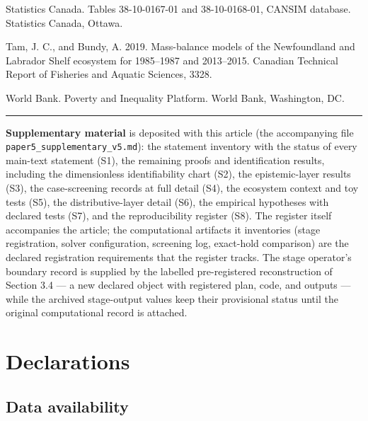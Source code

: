 \documentclass[11pt]{article}
\begin{document}
Statistics Canada. Tables 38-10-0167-01 and 38-10-0168-01, CANSIM
database. Statistics Canada, Ottawa.

Tam, J. C., and Bundy, A. 2019. Mass-balance models of the Newfoundland
and Labrador Shelf ecosystem for 1985--1987 and 2013--2015. Canadian
Technical Report of Fisheries and Aquatic Sciences, 3328.

World Bank. Poverty and Inequality Platform. World Bank, Washington, DC.

\begin{center}\rule{0.5\linewidth}{0.5pt}\end{center}

\textbf{Supplementary material} is deposited with this article (the
accompanying file \texttt{paper5\_supplementary\_v5.md}): the statement
inventory with the status of every main-text statement (S1), the
remaining proofs and identification results, including the dimensionless
identifiability chart (S2), the epistemic-layer results (S3), the
case-screening records at full detail (S4), the ecosystem context and
toy tests (S5), the distributive-layer detail (S6), the empirical
hypotheses with declared tests (S7), and the reproducibility register
(S8). The register itself accompanies the article; the computational
artifacts it inventories (stage registration, solver configuration,
screening log, exact-hold comparison) are the declared registration
requirements that the register tracks. The stage operator's boundary
record is supplied by the labelled pre-registered reconstruction of
Section 3.4 --- a new declared object with registered plan, code, and
outputs --- while the archived stage-output values keep their
provisional status until the original computational record is attached.

\section*{Declarations}

\subsection*{Data availability}
\end{document}
